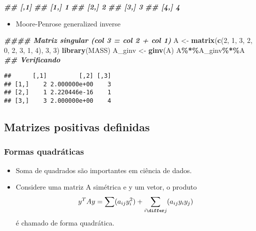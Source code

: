 \documentclass[
]{article}
\newenvironment{Shaded}{\begin{snugshade}}{\end{snugshade}}
\newcommand{\DecValTok}[1]{\textcolor[rgb]{0.00,0.00,0.81}{#1}}
\newcommand{\DocumentationTok}[1]{\textcolor[rgb]{0.56,0.35,0.01}{\textbf{\textit{#1}}}}
\newcommand{\FunctionTok}[1]{\textcolor[rgb]{0.13,0.29,0.53}{\textbf{#1}}}
\newcommand{\NormalTok}[1]{#1}
\newcommand{\OtherTok}[1]{\textcolor[rgb]{0.56,0.35,0.01}{#1}}
\newcommand{\SpecialCharTok}[1]{\textcolor[rgb]{0.81,0.36,0.00}{\textbf{#1}}}
\providecommand{\tightlist}{%
  \setlength{\itemsep}{0pt}\setlength{\parskip}{0pt}}
\begin{document}
\begin{Shaded}
\begin{Highlighting}[]
\DocumentationTok{\#\# [,1]}
\DocumentationTok{\#\# [1,] 1}
\DocumentationTok{\#\# [2,] 2}
\DocumentationTok{\#\# [3,] 3}
\DocumentationTok{\#\# [4,] 4}
\end{Highlighting}
\end{Shaded}

\begin{itemize}
\tightlist
\item
  Moore-Penrose generalized inverse
\end{itemize}

\begin{Shaded}
\begin{Highlighting}[]
\DocumentationTok{\#\#\#\# Matriz singular (col 3 = col 2 + col 1)}
\NormalTok{A }\OtherTok{\textless{}{-}} \FunctionTok{matrix}\NormalTok{(}\FunctionTok{c}\NormalTok{(}\DecValTok{2}\NormalTok{, }\DecValTok{1}\NormalTok{, }\DecValTok{3}\NormalTok{, }\DecValTok{2}\NormalTok{, }\DecValTok{0}\NormalTok{,}
\DecValTok{2}\NormalTok{, }\DecValTok{3}\NormalTok{, }\DecValTok{1}\NormalTok{, }\DecValTok{4}\NormalTok{), }\DecValTok{3}\NormalTok{, }\DecValTok{3}\NormalTok{)}
\FunctionTok{library}\NormalTok{(MASS)}
\NormalTok{A\_ginv }\OtherTok{\textless{}{-}} \FunctionTok{ginv}\NormalTok{(A)}
\NormalTok{A}\SpecialCharTok{\%*\%}\NormalTok{A\_ginv}\SpecialCharTok{\%*\%}\NormalTok{A }\DocumentationTok{\#\# Verificando}
\end{Highlighting}
\end{Shaded}

\begin{verbatim}
##      [,1]         [,2] [,3]
## [1,]    2 2.000000e+00    3
## [2,]    1 2.220446e-16    1
## [3,]    3 2.000000e+00    4
\end{verbatim}

\hypertarget{matrizes-positivas-definidas}{%
\subsection{Matrizes positivas
definidas}\label{matrizes-positivas-definidas}}

\hypertarget{formas-quadruxe1ticas}{%
\subsubsection{Formas quadráticas}\label{formas-quadruxe1ticas}}

\begin{itemize}
\tightlist
\item
  Soma de quadrados são importantes em ciência de dados.
\item
  Considere uma matriz A simétrica e y um vetor, o produto \[
  y^{T}Ay = 
  \sum(a_{ij}y^{2}_{i}) + 
  \sum_{i \differ j}(a_{ij}y_{i}y_{j})
  \] é chamado de forma quadrática.
\end{itemize}
\end{document}
